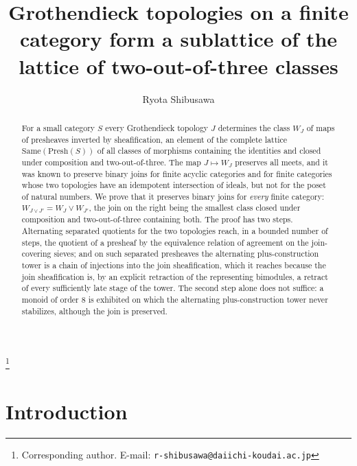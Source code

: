 \documentclass[11pt]{amsart}
\theoremstyle{definition}
\newcommand{\Same}{\mathrm{Same}}
\newcommand{\Presh}{\mathrm{Presh}}
\begin{document}
\title[Topologies on a finite category and the sameness lattice]{Grothendieck topologies on a finite category form a sublattice of the lattice of two-out-of-three classes}
\author{Ryota Shibusawa}
\thanks{Corresponding author. E-mail: \texttt{r-shibusawa@daiichi-koudai.ac.jp}}
\address{Daiichi Institute of Technology}

\begin{abstract}
For a small category $S$ every Grothendieck topology $J$ determines the class
$W_J$ of maps of presheaves inverted by sheafification, an element of the
complete lattice $\Same(\Presh(S))$ of all classes of morphisms containing the
identities and closed under composition and two-out-of-three. The map
$J\mapsto W_J$ preserves all meets, and it was known to preserve binary joins
for finite acyclic categories and for finite categories whose two topologies
have an idempotent intersection of ideals, but not for the poset of natural
numbers. We prove that it preserves binary joins for \emph{every} finite
category: $W_{J\vee J'}=W_J\vee W_{J'}$, the join on the right being the
smallest class closed under composition and two-out-of-three containing both.
The proof has two steps. Alternating separated quotients for the two
topologies reach, in a bounded number of steps, the quotient of a presheaf by
the equivalence relation of agreement on the join-covering sieves; and on such
separated presheaves the alternating plus-construction tower is a chain of
injections into the join sheafification, which it reaches because the join
sheafification is, by an explicit retraction of the representing bimodules, a
retract of every sufficiently late stage of the tower. The second step alone does not suffice: a monoid of
order $8$ is exhibited on which the alternating plus-construction tower never
stabilizes, although the join is preserved.
\end{abstract}

\maketitle

\section{Introduction}
\end{document}

